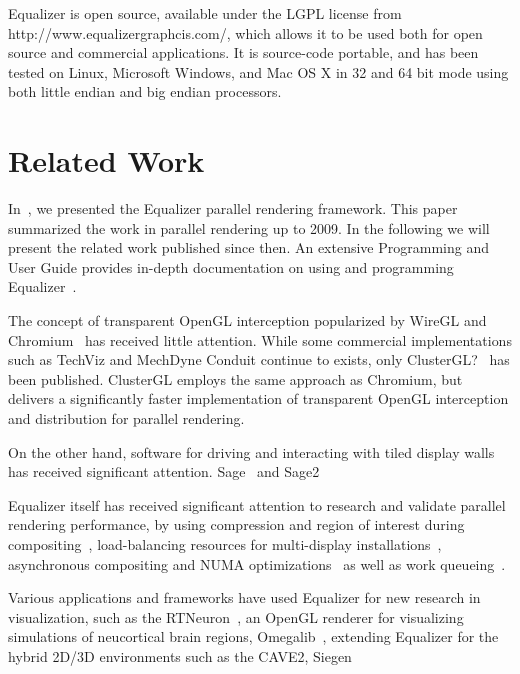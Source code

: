 \documentclass[10pt,journal,compsoc]{IEEEtran}
\begin{document}
Equalizer is open source, available under the LGPL license from http://www.equalizergraphcis.com/, which allows it to be used both for open source and commercial applications. It is source-code portable, and has been tested on Linux, Microsoft Windows, and Mac OS X in 32 and 64 bit mode using both little endian and big endian processors.


\section{Related Work}\label{SEC_related}

In~\cite{EMP:09}, we presented the Equalizer parallel rendering framework. This
paper summarized the work in parallel rendering up to 2009. In the following we
will present the related work published since then. An extensive Programming and
User Guide provides in-depth documentation on using and programming
Equalizer~\cite{Eilemann:13}.

The concept of transparent OpenGL interception popularized by WireGL and
Chromium~\cite{HHNFAKK:02} has received little attention. While some commercial
implementations such as TechViz and MechDyne Conduit continue to exists, only
ClusterGL?~\cite{NHM:11} has been published. ClusterGL employs the same approach
as Chromium, but delivers a significantly faster implementation of transparent
OpenGL interception and distribution for parallel rendering.

On the other hand, software for driving and interacting with tiled display walls
has received significant attention. Sage~\cite{TBD} and Sage2~\cite{TBD}

Equalizer itself has received significant attention to research and validate
parallel rendering performance, by using compression and region of interest
during compositing~\cite{MEP:10}, load-balancing resources for multi-display
installations~\cite{EEP:11}, asynchronous compositing and NUMA
optimizations~\cite{EBAHMP:12} as well as work queueing~\cite{SPEP:16}.

Various applications and frameworks have used Equalizer for new research in
visualization, such as the RTNeuron~\cite{HBBES:13}, an OpenGL renderer for
visualizing simulations of neucortical brain regions, Omegalib~\cite{TBD},
extending Equalizer for the hybrid 2D/3D environments such as the CAVE2,
Siegen~\cite{TBD}
\end{document}
